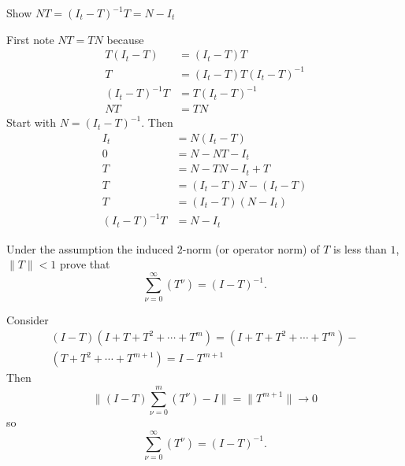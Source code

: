 \documentclass[12pt]{article}
\begin{document}
\begin{exercise}
    Show \( NT = (I_t - T)^{-1} T = N - I_t \)
\end{exercise}
\begin{solution}
    First note \( NT = TN \) because
    \begin{align*}
        T (I_t - T) &= (I_t -T)T \\
        T &= (I_t - T) T (I_t - T)^{-1} \\
        (I_t - T)^{-1} T &= T (I_t - T)^{-1} \\
        NT &= TN
    \end{align*}
    Start with \( N = (I_t-T)^{-1} \).  Then
    \begin{align*}
        I_t &= N(I_t-T) \\
        0 &= N - NT - I_t \\
        T &= N - TN - I_t + T \\
        T &= (I_t - T) N - (I_t - T) \\
        T &= (I_t-T)(N - I_t) \\
        (I_t - T)^{-1} T &= N - I_t
    \end{align*}
\end{solution}

\begin{exercise}
    Under the assumption the induced \( 2 \)-norm (or operator norm) of \(
    T \) is less than \( 1 \), \( \| T \| < 1 \) prove that
    \[
        \sum_{\nu=0}^{\infty} (T^\nu) = (I - T)^{-1}.
    \]

\end{exercise}
\begin{solution}
    Consider
    \begin{multline*}
        (I-T)(I + T + T^2 + \cdots + T^m) = (I + T + T^2 + \cdots + T^m)
        - \\
        (T + T^2 + \cdots + T^{m+1}) = I - T^{m+1}
    \end{multline*}
    Then
    \[
        \| (I-T) \sum_{\nu=0}^{m} (T^\nu) - I \| = \| T^{m+1} \| \to 0
    \] so
    \[
        \sum_{\nu=0}^{\infty} (T^\nu) = (I - T)^{-1}.
    \]
\end{solution}
\end{document}
